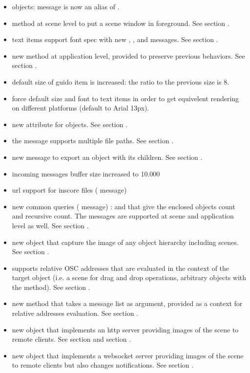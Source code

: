 \begin{itemize}
\item {} objects:  message is now an alias of . 
\item {} method at scene level to put a scene window in foreground. See section .
\item text items support font spec with new , ,  and  messages. See section .
\item new  method at application level, provided to preserve previous behaviors. See section .
\item default size of guido item is increased: the ratio to the previous size is 8.
\item force default size and font to text items in order to get equivelent rendering on different platforms (default to Arial 13px).
\item new  attribute for  objects. See section .
\item the  message supports multiple file paths. See section .
\item new  message to export an object with its children. See section .

\item incoming messages buffer size increased to 10.000
\item url support for inscore files ( message)

\item new common queries ( message) :  and  that give the enclosed objects count and recursive count. The messages are supported at scene and application level as well. See section .
\item new  object that capture the image of any object hierarchy including scenes. See section .
\item supports relative OSC addresses that are evaluated in the context of the target object 
  (i.e. a scene for drag and drop operations, arbitrary objects with the  method). See section .
\item new  method that takes a message list as argument, provided as a context for relative addresses evaluation. See section .
\item new  object that implements an http server providing images of the scene to remote clients. See section  and section .
\item new  object that implements a websocket server providing images of the scene to remote clients but also changes notifications. See section .


\end{itemize}
